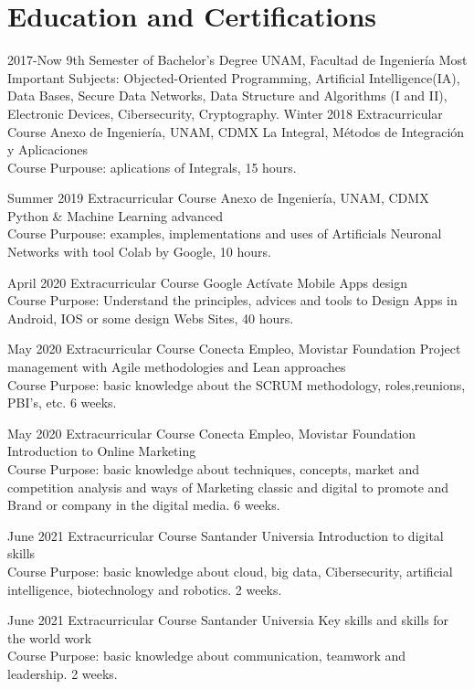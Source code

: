 \documentclass[]{friggeri-cv}
\begin{document}
\section{Education and Certifications}
\begin{entrylist}
\entry
    {2017-Now}
    {9th Semester of Bachelor's Degree}
    {UNAM, Facultad de Ingeniería}
    {Most Important Subjects: Objected-Oriented Programming, Artificial Intelligence(IA), Data Bases, Secure Data Networks, Data Structure and Algorithms (I and II), Electronic Devices, Cibersecurity, Cryptography.
    }
\entry
    {Winter 2018}
    {Extracurricular Course}
    {Anexo de Ingeniería, UNAM, CDMX}
    {La Integral, Métodos de Integración y Aplicaciones\\
    Course Purpouse: aplications of Integrals, 15 hours.}

\entry
    {Summer 2019}
    {Extracurricular Course}
    {Anexo de Ingeniería, UNAM, CDMX}
    {Python \& Machine Learning advanced\\
    Course Purpouse: examples, implementations and uses of Artificials Neuronal Networks with tool Colab by Google, 10 hours.}
    
\entry
    {April 2020}
    {Extracurricular Course}
    {Google Actívate}
    {Mobile Apps design\\
    Course Purpose: Understand the principles, advices and tools to Design Apps in Android, IOS or some design Webs Sites, 40 hours.}
    
\entry
    {May 2020}
    {Extracurricular Course}
    {Conecta Empleo, Movistar Foundation}
    {Project management with Agile methodologies and Lean approaches\\
    Course Purpose: basic knowledge about the SCRUM methodology, roles,reunions, PBI's, etc. 6 weeks.}    

\entry
    {May 2020}
    {Extracurricular Course}
    {Conecta Empleo, Movistar Foundation}
    {Introduction to Online Marketing\\
    Course Purpose: basic knowledge about techniques, concepts, market and competition analysis and ways of Marketing classic and digital to promote and Brand or company in the digital media. 6 weeks. }
    
\entry
    {June 2021}
    {Extracurricular Course}
    {Santander Universia}
    {Introduction to digital skills\\
    Course Purpose: basic knowledge about cloud, big data, Cibersecurity, artificial intelligence, biotechnology and robotics. 2 weeks.}

\entry
    {June 2021}
    {Extracurricular Course}
    {Santander Universia}
    {Key skills and skills for the world work\\
    Course Purpose: basic knowledge about communication, teamwork and leadership. 2 weeks. }
    
\end{entrylist}
\end{document}

